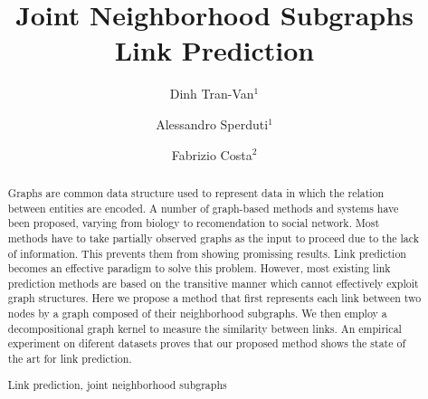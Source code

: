 \documentclass[runningheads,a4paper]{llncs}
\newcommand{\keywords}[1]{\par\addvspace\baselineskip
\noindent\keywordname\enspace\ignorespaces#1}
\begin{document}
\mainmatter  %

\title{Joint Neighborhood Subgraphs Link Prediction}


%
%
\author{Dinh Tran-Van$^1$ \and Alessandro Sperduti$^1$ \and Fabrizio Costa$^2$}
%


%
%

\maketitle


\begin{abstract}
Graphs are common data structure used to represent data in which the relation between entities are encoded. A number of graph-based methods and systems have been proposed, varying from biology to recomendation to social network. Most methods have to take partially observed graphs as the input to proceed due to the lack of information. This prevents them from showing promissing results. Link prediction becomes an effective paradigm to solve this problem. However, most existing link prediction methods are based on the transitive manner which cannot effectively exploit graph structures. Here we propose a method that first represents each link between two nodes by a graph composed of their neighborhood subgraphs. We then employ a decompositional graph kernel to measure the similarity between links. An empirical experiment on diferent datasets proves that our proposed method shows the state of the art for link prediction.
\keywords{Link prediction, joint neighborhood subgraphs}
\end{abstract}
\end{document}
